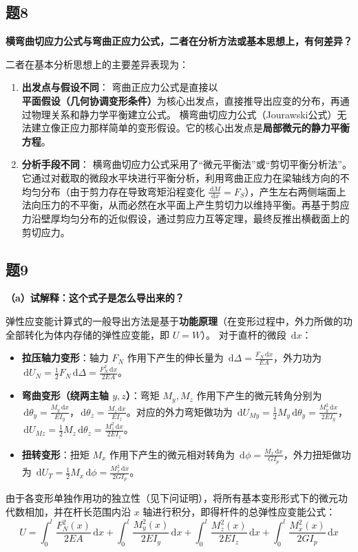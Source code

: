 \documentclass[11pt,a4paper]{ctexrep}
\newcommand{\diff}{\,\mathrm{d}}
\begin{document}
{\subsection*{题8}
\textbf{横弯曲切应力公式与弯曲正应力公式，二者在分析方法或基本思想上，有何差异？}

二者在基本分析思想上的主要差异表现为：
\begin{enumerate}
    \item \textbf{出发点与假设不同}：
          弯曲正应力公式是直接以\textbf{平面假设（几何协调变形条件）}为核心出发点，直接推导出应变的分布，再通过物理关系和静力学平衡建立公式。
          横弯曲切应力公式（Jourawski公式）无法建立像正应力那样简单的变形假设。它的核心出发点是\textbf{局部微元的静力平衡方程}。
    \item \textbf{分析手段不同}：
          横弯曲切应力公式采用了“微元平衡法”或“剪切平衡分析法”。它通过对截取的微段水平块进行平衡分析，利用弯曲正应力在梁轴线方向的不均匀分布（由于剪力存在导致弯矩沿程变化 $\frac{\diff M}{\diff x} = F_S$），产生左右两侧端面上法向压力的不平衡，从而必然在水平面上产生剪切力以维持平衡。再基于剪应力沿壁厚均匀分布的近似假设，通过剪应力互等定理，最终反推出横截面上的剪切应力。
\end{enumerate}

\subsection*{题9}
\textbf{（a）试解释：这个式子是怎么导出来的？}

弹性应变能计算式的一般导出方法是基于\textbf{功能原理}（在变形过程中，外力所做的功全部转化为体内存储的弹性应变能，即 $U = W$）。
对于直杆的微段 $\diff x$：
\begin{itemize}
    \item \textbf{拉压轴力变形}：轴力 $F_N$ 作用下产生的伸长量为 $\diff \Delta = \frac{F_N \diff x}{EA}$，外力功为 $\diff U_N = \frac{1}{2} F_N \diff \Delta = \frac{F_N^2 \diff x}{2EA}$。
    \item \textbf{弯曲变形（绕两主轴 $y, z$）}：弯矩 $M_y, M_z$ 作用下产生的微元转角分别为 $\diff \theta_y = \frac{M_y \diff x}{EI_y}$，$\diff \theta_z = \frac{M_z \diff x}{EI_z}$。对应的外力弯矩做功为 $\diff U_{My} = \frac{1}{2} M_y \diff \theta_y = \frac{M_y^2 \diff x}{2EI_y}$，$\diff U_{Mz} = \frac{1}{2} M_z \diff \theta_z = \frac{M_z^2 \diff x}{2EI_z}$。
    \item \textbf{扭转变形}：扭矩 $M_x$ 作用下产生的微元相对转角为 $\diff \phi = \frac{M_x \diff x}{GI_p}$，外力扭矩做功为 $\diff U_T = \frac{1}{2} M_x \diff \phi = \frac{M_x^2 \diff x}{2GI_p}$。
\end{itemize}
由于各变形单独作用功的独立性（见下问证明），将所有基本变形形式下的微元功代数相加，并在杆长范围内沿 $x$ 轴进行积分，即得杆件的总弹性应变能公式：
\[
    U = \int_0^l \frac{F_N^2(x)}{2EA} \diff x + \int_0^l \frac{M_y^2(x)}{2EI_y} \diff x + \int_0^l \frac{M_z^2(x)}{2EI_z} \diff x + \int_0^l \frac{M_x^2(x)}{2GI_p} \diff x
\]

}
\end{document}
